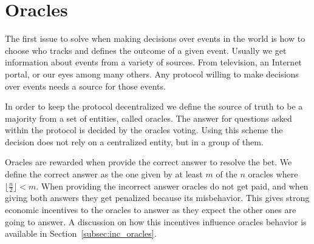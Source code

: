 \section{Oracles}

The first issue to solve when making decisions over events in the world is how
  to choose who tracks and defines the outcome of a given event.
Usually we get information about events from a variety of sources.
From television, an Internet portal, or our eyes among many others. Any protocol
  willing to make decisions over events needs a source for those events.

In order to keep the protocol decentralized we define the source of truth to be
  a majority from a set of entities, called oracles.
The answer for questions asked within the protocol is decided by the oracles
  voting.
Using this scheme the decision does not rely on a centralized entity, but in a
  group of them.

Oracles are rewarded when provide the correct answer to resolve the bet.
We define the correct answer as the one given by at least $m$ of the $n$ oracles
  where $\lfloor \frac{n}{2} \rfloor < m$.
When providing the incorrect answer oracles do not get paid, and when giving
  both answers they get penalized because its misbehavior. This gives strong
  economic incentives to the oracles to answer as they expect the other ones
  are going to answer.
A discussion on how this incentives influence oracles behavior is available
  in Section~\ref{subsec:inc_oracles}.
